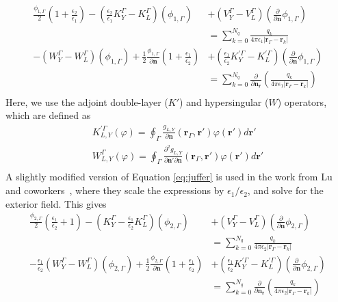 \begin{align}\label{eq:juffer}
\frac{\phi_{1,\Gamma}}{2}\left(1+\frac{\epsilon_2}{\epsilon_1}\right) - \left(\frac{\epsilon_2}{\epsilon_1}K_Y^\Gamma - K_L^\Gamma\right)(\phi_{1,\Gamma}) &+ \left(V_Y^\Gamma - V_L^\Gamma\right)\left( \frac{\partial}{\partial \mathbf{n}} \phi_{1,\Gamma} \right)\nonumber\\ 
&= \sum_{k=0}^{N_q}  \frac{q_k}{4\pi\epsilon_1|\mathbf{r}_{\Gamma} - \mathbf{r}_k|} \nonumber \\
- \left(W_Y^\Gamma - W_L^\Gamma\right)(\phi_{1,\Gamma}) +  \frac{1}{2}\frac{\phi_{1,\Gamma}}{\partial\mathbf{n}}\left(1+\frac{\epsilon_1}{\epsilon_2}\right) &+ \left(\frac{\epsilon_1}{\epsilon_2}K_Y^{\prime\Gamma} - K_L^{\prime\Gamma}\right)\left( \frac{\partial}{\partial \mathbf{n}} \phi_{1,\Gamma} \right)\nonumber\\ 
&= \sum_{k=0}^{N_q}  \frac{\partial}{\partial\mathbf{n}_\mathbf{r}}\left(\frac{q_k}{4\pi\epsilon_1|\mathbf{r}_{\Gamma} - \mathbf{r}_k|}\right) \nonumber \\
\end{align}
%
Here, we use the adjoint double-layer ($K'$) and hypersingular ($W$) operators, which are defined as
%
\begin{align}\label{eq:adj_hyp}
K^{\prime\Gamma}_{L,Y}(\varphi) = \oint_\Gamma \frac{g_{L,Y}}{\partial\mathbf{n}}(\mathbf{r}_\Gamma,\mathbf{r}')\varphi(\mathbf{r}')d\mathbf{r}'\nonumber\\
W^\Gamma_{L,Y}(\varphi) = \oint_\Gamma \frac{\partial^2 g_{L,Y}}{\partial\mathbf{n}'\partial\mathbf{n}}(\mathbf{r}_\Gamma,\mathbf{r}')\varphi(\mathbf{r}')d\mathbf{r}'\nonumber\\
\end{align}
%
A slightly modified version of Equation \eqref{eq:juffer} is used in the work from Lu and coworkers~\cite{LuETal2006,LuETal2009,ZhangETal2019}, where they scale the expressions by $\epsilon_1/\epsilon_2$, and solve for the exterior field. This gives
%
\begin{align}\label{eq:lu}
\frac{\phi_{2,\Gamma}}{2}\left(\frac{\epsilon_1}{\epsilon_2}+1\right) - \left(K_Y^\Gamma - \frac{\epsilon_1}{\epsilon_2}K_L^\Gamma\right)(\phi_{2,\Gamma}) &+ \left(V_Y^\Gamma - V_L^\Gamma\right)\left( \frac{\partial}{\partial \mathbf{n}} \phi_{2,\Gamma} \right)\nonumber\\ 
&= \sum_{k=0}^{N_q}  \frac{q_k}{4\pi\epsilon_2|\mathbf{r}_{\Gamma} - \mathbf{r}_k|} \nonumber \\
- \frac{\epsilon_1}{\epsilon_2}\left(W_Y^\Gamma - W_L^\Gamma\right)(\phi_{2,\Gamma}) +  \frac{1}{2}\frac{\phi_{2,\Gamma}}{\partial\mathbf{n}}\left(1+\frac{\epsilon_1}{\epsilon_2}\right) &+ \left(\frac{\epsilon_1}{\epsilon_2}K_Y^{\prime\Gamma} - K_L^{\prime\Gamma}\right)\left( \frac{\partial}{\partial \mathbf{n}} \phi_{2,\Gamma} \right)\nonumber\\ 
&= \sum_{k=0}^{N_q}  \frac{\partial}{\partial\mathbf{n}_\mathbf{r}}\left(\frac{q_k}{4\pi\epsilon_2|\mathbf{r}_{\Gamma} - \mathbf{r}_k|}\right) \nonumber \\
\end{align}

